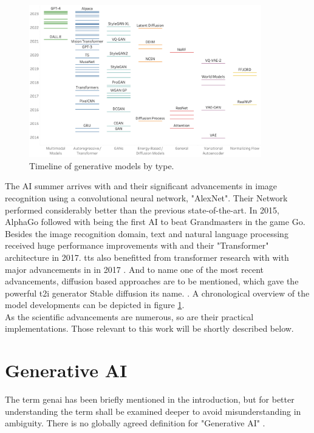 \documentclass[
  a4paper,  %
  twoside,  %
  bibliography=totoc,
  headsepline,
  cleardoublepage=empty,
  parskip=half,
  draft=false
]{scrbook}
\begin{document}
\begin{figure}[h]
  \centering
  \includegraphics[width=0.9\textwidth]{./graphics/images/Timeline_of_generative_models_by_type.png}
  \caption{Timeline of generative models by type. \citet{garcia-penalvoWhatWeMean2023}}
  \label{fig:timeline-models}
\end{figure}

The AI summer arrives with \citet{krizhevskyImageNetClassificationDeep2012} and their significant advancements in image recognition using a convolutional neural network, "AlexNet". Their Network performed considerably better than the previous state-of-the-art. In 2015, AlphaGo followed with being the first AI to beat Grandmasters in the game Go. \\
Besides the image recognition domain, text and natural language processing received huge performance improvements with  and their "Transformer" architecture in 2017. \gls{tts} also benefitted from transformer research with with major advancements in  in 2017 \cite{wangTacotronEndtoEndSpeech2017}. And to name one of the most recent advancements, diffusion based approaches are to be mentioned, which gave the powerful \gls{t2i} generator Stable diffusion its name. \cite{rombachHighResolutionImageSynthesis2022}. A chronological overview of the model developments can be depicted in figure \ref{fig:timeline-models}. \\
As the scientific advancements are numerous, so are their practical implementations. Those relevant to this work will be shortly described below.

\section{Generative AI}
\label{sec:genai}
The term \gls{genai} has been briefly mentioned in the introduction, but for better understanding the term shall be examined deeper to avoid misunderstanding in ambiguity. There is no globally agreed definition for "Generative AI" \cite{garcia-penalvoWhatWeMean2023}.
\end{document}
